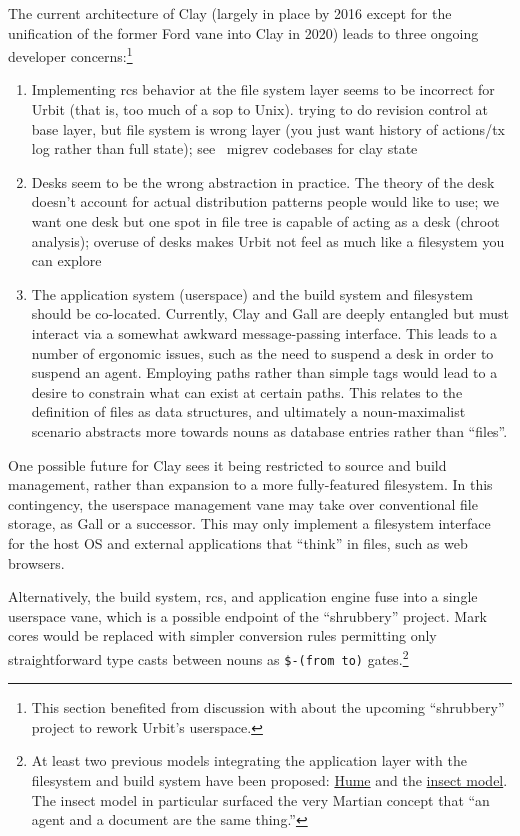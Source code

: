 \documentclass[twoside]{article}
\begin{document}
The current architecture of Clay (largely in place by 2016 except for the unification of the former Ford vane into Clay in 2020) leads to three ongoing developer concerns:\footnote{This section benefited from discussion with  about the upcoming ``shrubbery'' project to rework Urbit's userspace.}

\begin{enumerate}
  \item  Implementing {\sc rcs} behavior at the file system layer seems to be incorrect for Urbit (that is, too much of a sop to Unix).  trying to do revision control at base layer, but file system is wrong layer (you just want history of actions/tx log rather than full state); see ~migrev codebases for clay state
  \item  Desks seem to be the wrong abstraction in practice.  The theory of the desk doesn't account for actual distribution patterns people would like to use; we want one desk but one spot in file tree is capable of acting as a desk (chroot analysis); overuse of desks makes Urbit not feel as much like a filesystem you can explore
  \item  The application system (userspace) and the build system and filesystem should be co-located.  Currently, Clay and Gall are deeply entangled but must interact via a somewhat awkward message-passing interface.  This leads to a number of ergonomic issues, such as the need to suspend a desk in order to suspend an agent.  Employing paths rather than simple tags would lead to a desire to constrain what can exist at certain paths.  This relates to the definition of files as data structures, and ultimately a noun-maximalist scenario abstracts more towards nouns as database entries rather than ``files''.
\end{enumerate}

One possible future for Clay sees it being restricted to source and build management, rather than expansion to a more fully-featured filesystem.  In this contingency, the userspace management vane may take over conventional file storage, as Gall or a successor.  This may only implement a filesystem interface for the host OS and external applications that ``think'' in files, such as web browsers.

Alternatively, the build system, {\sc rcs}, and application engine fuse into a single userspace vane, which is a possible endpoint of the ``shrubbery'' project.  Mark cores would be replaced with simpler conversion rules permitting only straightforward type casts between nouns as \lstinline[style=inlinecode]{$-(from to)} gates.\footnote{At least two previous models integrating the application layer with the filesystem and build system have been proposed:  \href{https://gist.github.com/arthyn/0476d2f4e9912aa46746c3dd3cd20d15}{Hume} and the \href{https://gist.github.com/arthyn/f805f8294791adccbdb6e0454defb67a}{insect model}.  The insect model in particular surfaced the very Martian concept that ``an agent and a document are the same thing.''}
\end{document}
